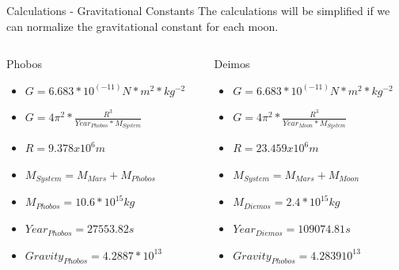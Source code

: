 \documentclass{beamer}  %
\begin{document}
\begin{frame}{Calculations - Gravitational Constants}
The calculations will be simplified if we can normalize the gravitational constant for each moon.

\begin{columns} %
 
 \begin{column}{0.50\textwidth} %
  \begin{block}{Phobos} %
   \begin{itemize}
   	\item $G = 6.683*10^(-11) N*m^2*kg^{-2}$
     \item $G = 4\pi ^{2}*\frac{R^{3}}{Year_{Phobos}*M_{System}}$
     \item $R =  9.378 x 10^6m$
	\item $M_{System} = M_{Mars} + M_{Phobos}$
	\item $M_{Phobos} = 10.6 * 10^{15} kg$
	\item $Year_{Phobos} = 27553.82 s$
	\item $Gravity_{Phobos} = 4.2887 * 10^{13}$
   \end{itemize}
  \end{block}
 \end{column}

 \begin{column}{0.50\textwidth} %
  \begin{block}{Deimos}
   \begin{itemize}
     \item $G = 6.683*10^(-11) N*m^2*kg^{-2}$
     \item $G = 4\pi ^{2}*\frac{R^{3}}{Year_{Moon}*M_{System}}$
     \item $R =  23.459 x 10^6m$
	\item $M_{System} = M_{Mars} + M_{Moon}$
	\item $M_{Diemos} = 2.4 * 10^{15} kg$
	\item $Year_{Diemos} = 109074.81 s$
	\item $Gravity_{Phobos} = 4.2839  10^{13}$
   \end{itemize}
  \end{block}
 \end{column}

\end{columns}

 \end{frame}
\end{document}
